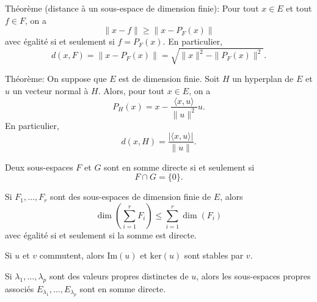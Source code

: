 \documentclass{article}
\begin{document}
\begin{itemize}[label=$\ast$]
\item Théorème (distance à un sous-espace de dimension finie): Pour tout $x \in E$ et tout $f \in F$, on a \[\| x - f \| \geq \| x - P_F(x) \| \]avec égalité si et seulement si $f = P_F(x)$. En particulier, \[d(x, F) = \| x - P_F(x) \| = \sqrt{\| x \|^2 - \| P_F(x) \|^2}.\]

\item Théorème: On suppose que $E$ est de dimension finie. Soit $H$ un hyperplan de $E$ et $u$ un vecteur normal à $H$. Alors, pour tout $x \in E$, on a \[P_H(x) = x - \frac{\langle x, u \rangle}{\| u \|^2} u.\]En particulier, \[d(x, H) = \frac{|\langle x, u \rangle|}{\| u \|}.\]

\begin{center} 


\item Deux sous-espaces $F$ et $G$ sont en somme directe si et seulement si \[F \cap G = \{0\}.\]

\item Si $F_1, \ldots, F_r$ sont des sous-espaces de dimension finie de $E$, alors \[\dim\left(\sum_{i=1}^{r} F_i\right) \leq \sum_{i=1}^{r} \dim(F_i)\]avec égalité si et seulement si la somme est directe.

\item Si $u$ et $v$ commutent, alors $\text{Im}(u)$ et $\text{ker}(u)$ sont stables par $v$.

\item Si $\lambda_1, \ldots, \lambda_p$ sont des valeurs propres distinctes de $u$, alors les sous-espaces propres associés $E_{\lambda_1}, \ldots, E_{\lambda_p}$ sont en somme directe.


\end{center}
\end{itemize}
\end{document}
